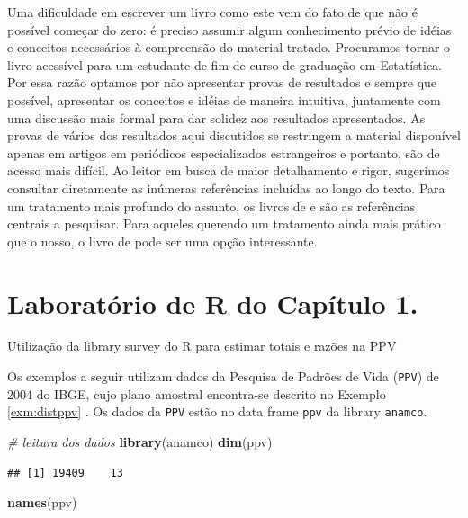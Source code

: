 \documentclass[]{book}
\newenvironment{Shaded}{\begin{snugshade}}{\end{snugshade}}
\newcommand{\KeywordTok}[1]{\textcolor[rgb]{0.13,0.29,0.53}{\textbf{#1}}}
\newcommand{\CommentTok}[1]{\textcolor[rgb]{0.56,0.35,0.01}{\textit{#1}}}
\newcommand{\NormalTok}[1]{#1}
\theoremstyle{definition}
\theoremstyle{definition}
\theoremstyle{definition}
\theoremstyle{remark}
\let\BeginKnitrBlock\begin \let\EndKnitrBlock\end
\begin{document}
Uma dificuldade em escrever um livro como este vem do fato de que não é
possível começar do zero: é preciso assumir algum conhecimento prévio de
idéias e conceitos necessários à compreensão do material tratado.
Procuramos tornar o livro acessível para um estudante de fim de curso de
graduação em Estatística. Por essa razão optamos por não apresentar
provas de resultados e sempre que possível, apresentar os conceitos e
idéias de maneira intuitiva, juntamente com uma discussão mais formal
para dar solidez aos resultados apresentados. As provas de vários dos
resultados aqui discutidos se restringem a material disponível apenas em
artigos em periódicos especializados estrangeiros e portanto, são de
acesso mais difícil. Ao leitor em busca de maior detalhamento e rigor,
sugerimos consultar diretamente as inúmeras referências incluídas ao
longo do texto. Para um tratamento mais profundo do assunto, os livros
de \citep{SHS89} e \citep{CHSK2003} são as referências centrais a
pesquisar. Para aqueles querendo um tratamento ainda mais prático que o
nosso, o livro de \citep{lethonen} pode ser uma opção interessante.

\section{Laboratório de R do Capítulo 1.}\label{epa}

\BeginKnitrBlock{example}
\protect\hypertarget{exm:exe12}{}{\label{exm:exe12} }Utilização da library
survey do R para estimar totais e razões na PPV
\EndKnitrBlock{example} Os exemplos a seguir utilizam dados da Pesquisa
de Padrões de Vida (\texttt{PPV}) de 2004 do IBGE, cujo plano amostral
encontra-se descrito no Exemplo \ref{exm:distppv} . Os dados da
\texttt{PPV} estão no data frame \texttt{ppv} da library
\texttt{anamco}.

\begin{Shaded}
\begin{Highlighting}[]
\CommentTok{# leitura dos dados}
\KeywordTok{library}\NormalTok{(anamco)}
\KeywordTok{dim}\NormalTok{(ppv)}
\end{Highlighting}
\end{Shaded}

\begin{verbatim}
## [1] 19409    13
\end{verbatim}

\begin{Shaded}
\begin{Highlighting}[]
\KeywordTok{names}\NormalTok{(ppv)}
\end{Highlighting}
\end{Shaded}
\end{document}
